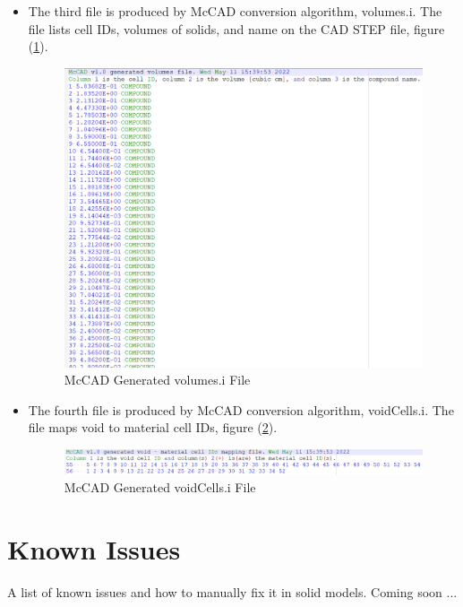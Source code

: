 \documentclass[letterpaper, 12 pt]{report}
\begin{document}
\begin{enumerate}
\begin{itemize}
	\item The third file is produced by McCAD conversion algorithm, volumes.i. The file lists cell IDs, volumes of solids, and name on the CAD STEP file, figure (\ref{fig:volumes file}).
	\begin{figure}[h]
		\centering
		\includegraphics[scale=0.4]{figures/volumesFile.png}
		\caption{McCAD Generated volumes.i File}
		\label{fig:volumes file}
	\end{figure}

	\item The fourth file is produced by McCAD conversion algorithm, voidCells.i. The file maps void to material cell IDs, figure (\ref{fig:void cells file}).
	\begin{figure}[h]
		\centering
		\includegraphics[scale=0.4]{figures/voidCellFile.png}
		\caption{McCAD Generated voidCells.i File}
		\label{fig:void cells file}
	\end{figure}
  \end{itemize} 
\end{enumerate}

\section{Known Issues} \label{Known Issues}
A list of known issues and how to manually fix it in solid models. Coming soon ...
\end{document}
